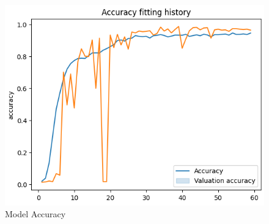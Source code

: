     \begin{figure}[H]
        \centering
        \includegraphics[]{cnn_acc_history.png}
        \caption{Model Accuracy}
        \end{figure}
        
